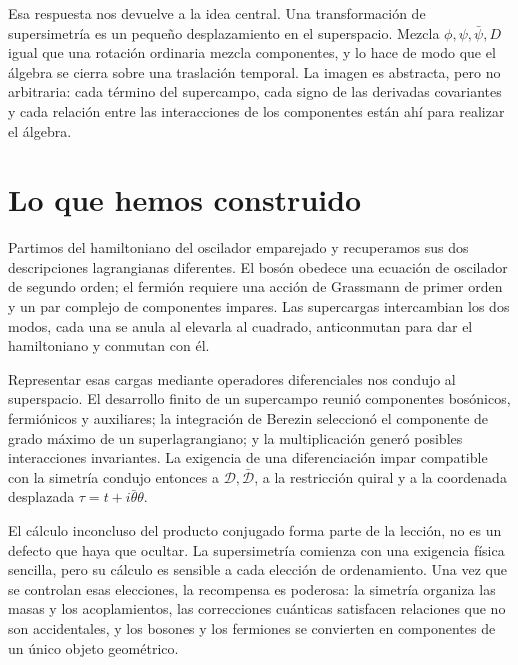 Esa respuesta nos devuelve a la idea central. Una transformación de supersimetría es un pequeño desplazamiento en el superspacio. Mezcla \(\phi,\psi,\bar\psi,D\) igual que una rotación ordinaria mezcla componentes, y lo hace de modo que el álgebra se cierra sobre una traslación temporal. La imagen es abstracta, pero no arbitraria: cada término del supercampo, cada signo de las derivadas covariantes y cada relación entre las interacciones de los componentes están ahí para realizar el álgebra.

\section{Lo que hemos construido}

Partimos del hamiltoniano del oscilador emparejado y recuperamos sus dos descripciones lagrangianas diferentes. El bosón obedece una ecuación de oscilador de segundo orden; el fermión requiere una acción de Grassmann de primer orden y un par complejo de componentes impares. Las supercargas intercambian los dos modos, cada una se anula al elevarla al cuadrado, anticonmutan para dar el hamiltoniano y conmutan con él.

Representar esas cargas mediante operadores diferenciales nos condujo al superspacio. El desarrollo finito de un supercampo reunió componentes bosónicos, fermiónicos y auxiliares; la integración de Berezin seleccionó el componente de grado máximo de un superlagrangiano; y la multiplicación generó posibles interacciones invariantes. La exigencia de una diferenciación impar compatible con la simetría condujo entonces a \(\mathcal D,\bar{\mathcal D}\), a la restricción quiral y a la coordenada desplazada \(\tau=t+i\bar\theta\theta\).

El cálculo inconcluso del producto conjugado forma parte de la lección, no es un defecto que haya que ocultar. La supersimetría comienza con una exigencia física sencilla, pero su cálculo es sensible a cada elección de ordenamiento. Una vez que se controlan esas elecciones, la recompensa es poderosa: la simetría organiza las masas y los acoplamientos, las correcciones cuánticas satisfacen relaciones que no son accidentales, y los bosones y los fermiones se convierten en componentes de un único objeto geométrico.
